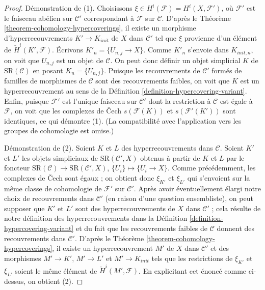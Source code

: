 \begin{proof}
\medskip\noindent
Démonstration de (1). Choisissons $\xi \in H^i(\mathcal{F}) = H^i(X, \mathcal{F}')$,
où $\mathcal{F}'$ est le faisceau abélien sur $\mathcal{C}'$ correspondant
à $\mathcal{F}$ sur $\mathcal{C}$. D'après le
Théorème \ref{theorem-cohomology-hypercoverings},
il existe un morphisme d'hyperrecouvrements $K' \to K_{init}$
de $X$ dans $\mathcal{C}'$ tel que $\xi$ provienne d'un élément
de $\check{H}^i(K', \mathcal{F})$.
Écrivons $K'_n = \{U_{n, j} \to X\}$. Comme $K'_n$ s'envoie dans
$K_{init, n}$, on voit que $U_{n, j}$ est un objet de $\mathcal{C}$.
On peut donc définir un objet simplicial $K$ de $\text{SR}(\mathcal{C})$
en posant $K_n = \{U_{n, j}\}$. Puisque les recouvrements de
$\mathcal{C}'$ formés de familles de morphismes de $\mathcal{C}$
sont des recouvrements faibles, on voit que $K$ est un hyperrecouvrement au sens
de la Définition \ref{definition-hypercovering-variant}.
Enfin, puisque $\mathcal{F}'$ est l'unique faisceau sur $\mathcal{C}'$
dont la restriction à $\mathcal{C}$ est égale à $\mathcal{F}$,
on voit que les complexes de {\v C}ech $s(\mathcal{F}(K))$
et $s(\mathcal{F}'(K'))$ sont identiques, ce qui démontre (1).
(La compatibilité avec l'application vers les groupes de cohomologie est omise.)

\medskip\noindent
Démonstration de (2). Soient $K$ et $L$ des hyperrecouvrements dans $\mathcal{C}$.
Soient $K'$ et $L'$ les objets simpliciaux de $\text{SR}(\mathcal{C}', X)$
obtenus à partir de $K$ et $L$ par le foncteur
$\text{SR}(\mathcal{C}) \to \text{SR}(\mathcal{C}', X)$,
$\{U_i\} \mapsto \{U_i \to X\}$. Comme précédemment, les complexes de
{\v C}ech sont égaux ; on obtient donc $\xi_{K'}$ et
$\xi_{L'}$ qui s'envoient sur la même classe de cohomologie de $\mathcal{F}'$
sur $\mathcal{C}'$. Après avoir éventuellement élargi notre choix
de recouvrements dans $\mathcal{C}'$ (en raison d'une question ensembliste),
on peut supposer que $K'$ et $L'$ sont des hyperrecouvrements de $X$ dans
$\mathcal{C}'$ ; cela résulte de notre définition des hyperrecouvrements dans la
Définition \ref{definition-hypercovering-variant} et
du fait que les recouvrements faibles de $\mathcal{C}$ donnent des recouvrements dans
$\mathcal{C}'$. D'après le
Théorème \ref{theorem-cohomology-hypercoverings},
il existe un hyperrecouvrement $M'$ de $X$ dans $\mathcal{C}'$
et des morphismes $M' \to K'$, $M' \to L'$ et $M' \to K_{init}$
tels que les restrictions de $\xi_{K'}$ et $\xi_{L'}$ soient le même élément de
$\check{H}^i(M', \mathcal{F})$. En explicitant cet énoncé comme ci-dessus,
on obtient (2).
\end{proof}





